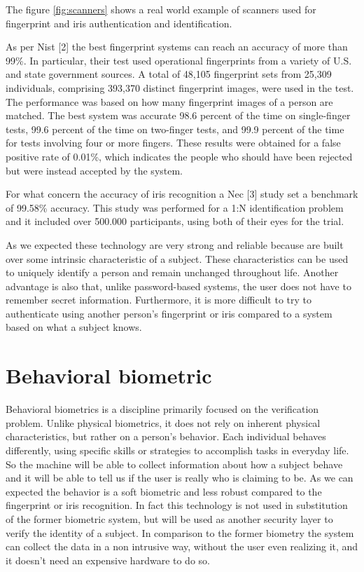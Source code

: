 \documentclass[12pt]{report}
\begin{document}
The figure \ref{fig:scanners} shows a real world example of scanners used for fingerprint and iris authentication and identification.

As per Nist [2] the best fingerprint systems can reach an accuracy of more than 99\%.
In particular, their test used operational fingerprints from a variety of U.S. and state government sources. 
A total of 48,105 fingerprint sets from 25,309 individuals, comprising 393,370 distinct fingerprint images, were used in the test.
The performance was based on how many fingerprint images of a person are matched.
The best system was accurate 98.6 percent of the time on single-finger tests, 99.6 percent of the time on two-finger tests, and 99.9 percent of the time for tests involving four or more fingers.
These results were obtained for a false positive rate of 0.01\%, which indicates the people who should have been rejected but were instead accepted by the system.

For what concern the accuracy of iris recognition a Nec [3] study set a benchmark of 99.58\% accuracy.
This study was performed for a 1:N identification problem and it included over 500.000 participants, using both of their eyes for the trial.

As we expected these technology are very strong and reliable because are built over some intrinsic characteristic of a subject.
These characteristics can be used to uniquely identify a person and remain unchanged throughout life.
Another advantage is also that, unlike password-based systems, the user does not have to remember secret information.
Furthermore, it is more difficult to try to authenticate using another person's fingerprint or iris compared to a system based on what a subject knows.

\section{Behavioral biometric}

Behavioral biometrics is a discipline primarily focused on the verification problem.
Unlike physical biometrics, it does not rely on inherent physical characteristics, but rather on a person's behavior. 
Each individual behaves differently, using specific skills or strategies to accomplish tasks in everyday life.
So the machine will be able to collect information about how a subject behave and it will be able to tell us if the user is really who is claiming to be.
As we can expected the behavior is a soft biometric and less robust compared to the fingerprint or iris recognition.
In fact this technology is not used in substitution of the former biometric system, but will be used as another security layer to verify the identity of a subject.
In comparison to the former biometry the system can collect the data in a non intrusive way, without the user even realizing it, and it doesn't need an expensive hardware to do so.
\end{document}
